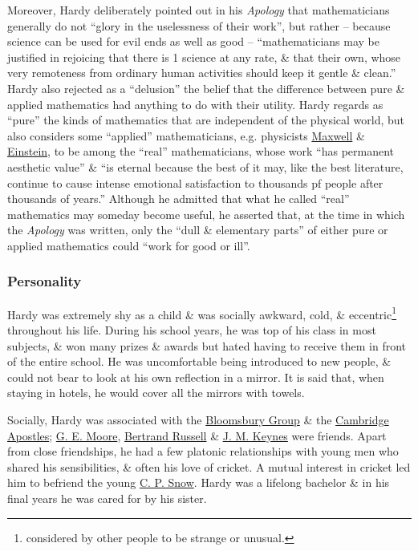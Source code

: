 \documentclass{article}
\begin{document}
Moreover, {\sc Hardy} deliberately pointed out in his {\it Apology} that mathematicians generally do not ``glory in the uselessness of their work'', but rather -- because science can be used for evil ends as well as good -- ``mathematicians may be justified in rejoicing that there is 1 science at any rate, \& that their own, whose very remoteness from ordinary human activities should keep it gentle \& clean.'' {\sc Hardy} also rejected as a ``delusion'' the belief that the difference between pure \& applied mathematics had anything to do with their utility. {\sc Hardy} regards as ``pure'' the kinds of mathematics that are independent of the physical world, but also considers some ``applied'' mathematicians, e.g. physicists \href{https://en.wikipedia.org/wiki/James_Clerk_Maxwell}{\sc Maxwell} \& \href{https://en.wikipedia.org/wiki/Albert_Einstein}{\sc Einstein}, to be among the ``real'' mathematicians, whose work ``has permanent aesthetic value'' \& ``is eternal because the best of it may, like the best literature, continue to cause intense emotional satisfaction to thousands pf people after thousands of years.'' Although he admitted that what he called ``real'' mathematics may someday become useful, he asserted that, at the time in which the {\it Apology} was written, only the ``dull \& elementary parts'' of either pure or applied mathematics could ``work for good or ill''.

\subsubsection{Personality}
{\sc Hardy} was extremely shy as a child \& was socially awkward, cold, \& eccentric\footnote{considered by other people to be strange or unusual.} throughout his life. During his school years, he was top of his class in most subjects, \& won many prizes \& awards but hated having to receive them in front of the entire school. He was uncomfortable being introduced to new people, \& could not bear to look at his own reflection in a mirror. It is said that, when staying in hotels, he would cover all the mirrors with towels.

Socially, {\sc Hardy} was associated with the \href{https://en.wikipedia.org/wiki/Bloomsbury_Group}{Bloomsbury Group} \& the \href{https://en.wikipedia.org/wiki/Cambridge_Apostles}{Cambridge Apostles}; \href{https://en.wikipedia.org/wiki/G._E._Moore}{\sc G. E. Moore}, \href{https://en.wikipedia.org/wiki/Bertrand_Russell}{Bertrand Russell} \& \href{https://en.wikipedia.org/wiki/J._M._Keynes}{J. M. Keynes} were friends. Apart from close friendships, he had a few platonic relationships with young men who shared his sensibilities, \& often his love of cricket. A mutual interest in cricket led him to befriend the young \href{https://en.wikipedia.org/wiki/C._P._Snow}{\sc C. P. Snow}. {\sf Hardy} was a lifelong bachelor \& in his final years he was cared for by his sister.
\end{document}
